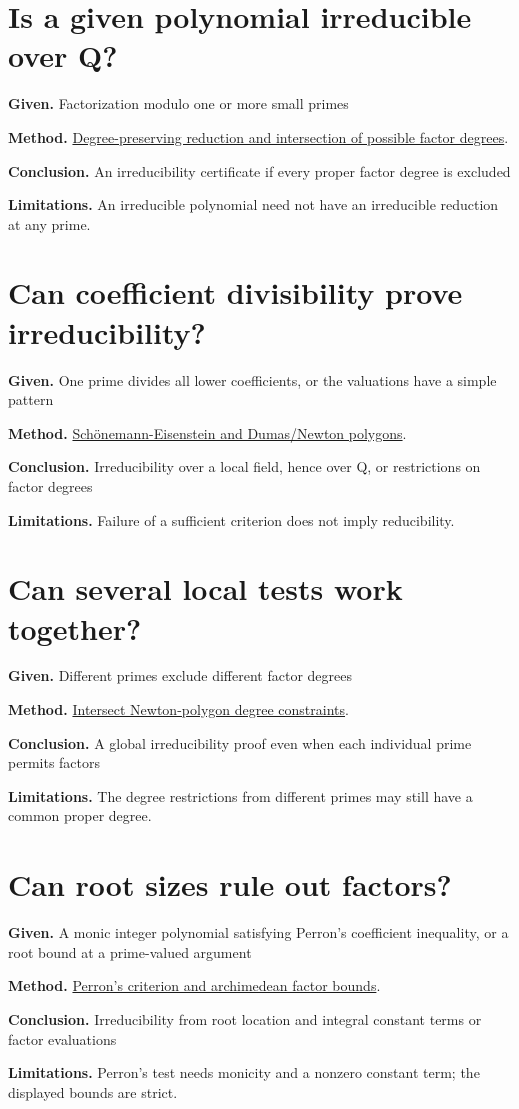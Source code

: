 \documentclass[11pt,a4paper,oneside,openany]{book}
\begin{document}
\section*{Is a given polynomial irreducible over Q?}
\textbf{Given.} Factorization modulo one or more small primes\par
\textbf{Method.} \hyperlink{article:modular-irreducibility}{Degree-preserving reduction and intersection of possible factor degrees}.\par
\textbf{Conclusion.} An irreducibility certificate if every proper factor degree is excluded\par
\textbf{Limitations.} An irreducible polynomial need not have an irreducible reduction at any prime.\par\medskip
\section*{Can coefficient divisibility prove irreducibility?}
\textbf{Given.} One prime divides all lower coefficients, or the valuations have a simple pattern\par
\textbf{Method.} \hyperlink{article:eisenstein-dumas}{Schönemann-Eisenstein and Dumas/Newton polygons}.\par
\textbf{Conclusion.} Irreducibility over a local field, hence over Q, or restrictions on factor degrees\par
\textbf{Limitations.} Failure of a sufficient criterion does not imply reducibility.\par\medskip
\section*{Can several local tests work together?}
\textbf{Given.} Different primes exclude different factor degrees\par
\textbf{Method.} \hyperlink{article:newton-polygons}{Intersect Newton-polygon degree constraints}.\par
\textbf{Conclusion.} A global irreducibility proof even when each individual prime permits factors\par
\textbf{Limitations.} The degree restrictions from different primes may still have a common proper degree.\par\medskip
\section*{Can root sizes rule out factors?}
\textbf{Given.} A monic integer polynomial satisfying Perron's coefficient inequality, or a root bound at a prime-valued argument\par
\textbf{Method.} \hyperlink{article:archimedean-criteria}{Perron's criterion and archimedean factor bounds}.\par
\textbf{Conclusion.} Irreducibility from root location and integral constant terms or factor evaluations\par
\textbf{Limitations.} Perron's test needs monicity and a nonzero constant term; the displayed bounds are strict.\par\medskip
\end{document}
